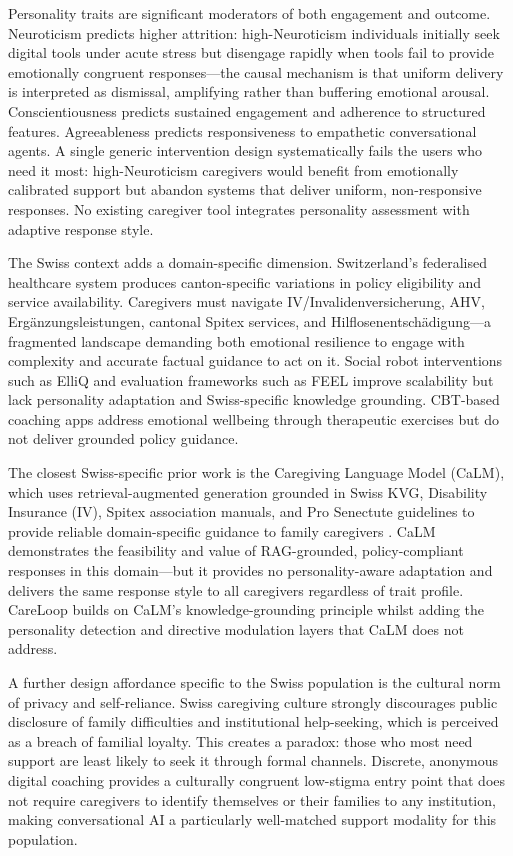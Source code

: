 \documentclass[10pt,a4paper]{report}
\begin{document}
Personality traits are significant moderators of both engagement and outcome. Neuroticism predicts higher attrition: high-Neuroticism individuals initially seek digital tools under acute stress but disengage rapidly when tools fail to provide emotionally congruent responses---the causal mechanism is that uniform delivery is interpreted as dismissal, amplifying rather than buffering emotional arousal. Conscientiousness predicts sustained engagement and adherence to structured features. Agreeableness predicts responsiveness to empathetic conversational agents. A single generic intervention design systematically fails the users who need it most: high-Neuroticism caregivers would benefit from emotionally calibrated support but abandon systems that deliver uniform, non-responsive responses. No existing caregiver tool integrates personality assessment with adaptive response style.

The Swiss context adds a domain-specific dimension. Switzerland's federalised healthcare system produces canton-specific variations in policy eligibility and service availability. Caregivers must navigate IV/Invalidenversicherung, AHV, Ergänzungsleistungen, cantonal Spitex services, and Hilflosenentschädigung---a fragmented landscape demanding both emotional resilience to engage with complexity and accurate factual guidance to act on it. Social robot interventions such as ElliQ \citep{Broadbent2024} and evaluation frameworks such as FEEL \citep{Zhang2024} improve scalability but lack personality adaptation and Swiss-specific knowledge grounding. CBT-based coaching apps address emotional wellbeing through therapeutic exercises but do not deliver grounded policy guidance.

The closest Swiss-specific prior work is the Caregiving Language Model (CaLM), which uses retrieval-augmented generation grounded in Swiss KVG, Disability Insurance (IV), Spitex association manuals, and Pro Senectute guidelines to provide reliable domain-specific guidance to family caregivers \citep{Schardong2021}. CaLM demonstrates the feasibility and value of RAG-grounded, policy-compliant responses in this domain---but it provides no personality-aware adaptation and delivers the same response style to all caregivers regardless of trait profile. CareLoop builds on CaLM's knowledge-grounding principle whilst adding the personality detection and directive modulation layers that CaLM does not address.

A further design affordance specific to the Swiss population is the cultural norm of privacy and self-reliance. Swiss caregiving culture strongly discourages public disclosure of family difficulties and institutional help-seeking, which is perceived as a breach of familial loyalty. This creates a paradox: those who most need support are least likely to seek it through formal channels. Discrete, anonymous digital coaching provides a culturally congruent low-stigma entry point that does not require caregivers to identify themselves or their families to any institution, making conversational AI a particularly well-matched support modality for this population.
\end{document}
